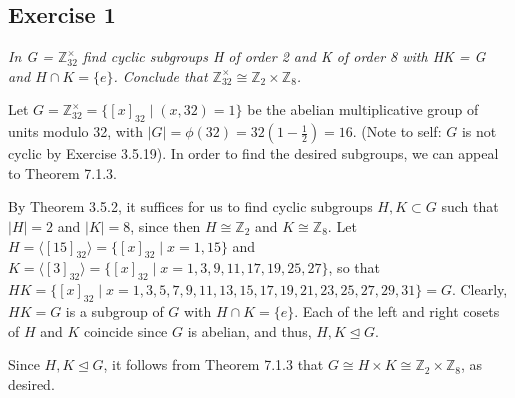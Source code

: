 \subsection*{Exercise 1}
\textit{In G = $\mathbb{Z}_{32}^\times$ find cyclic subgroups H of order 2 and K of order 8 with HK = G and $H \cap K = \{e\}$. Conclude that $\mathbb{Z}_{32}^\times \cong \mathbb{Z}_2 \times \mathbb{Z}_8$.}

\vspace{5 mm}
Let $G = \mathbb{Z}_{32}^\times = \{[x]_{32} \mid (x,32) = 1 \}$ be the abelian multiplicative group of units modulo 32, with $|G| = \phi(32) = 32(1 - \frac{1}{2}) = 16$. (Note to self: $G$ is not cyclic by Exercise 3.5.19). In order to find the desired subgroups, we can appeal to Theorem 7.1.3. 

By Theorem 3.5.2, it suffices for us to find cyclic subgroups $H,K \subset G$ such that $|H| = 2$ and $|K| = 8$, since then $H \cong \mathbb{Z}_2$ and $K \cong \mathbb{Z}_8$. Let $H = \langle [15]_{32} \rangle = \{[x]_{32} \mid x = 1,15\}$ and $K = \langle [3]_{32} \rangle = \{[x]_{32} \mid x = 1,3,9,11,17,19,25,27\}$, so that $HK = \{[x]_{32} \mid x = 1,3,5,7,9,11,13,15,17,19,21,23,25,27,29,31\} = G$. Clearly, $HK = G$ is a subgroup of $G$ with $H \cap K = \{e\}$. Each of the left and right cosets of $H$ and $K$ coincide since $G$ is abelian, and thus, $H,K \trianglelefteq G$.

Since $H,K \trianglelefteq G$, it follows from Theorem 7.1.3 that $G \cong H \times K \cong \mathbb{Z}_2 \times \mathbb{Z}_8$, as desired.